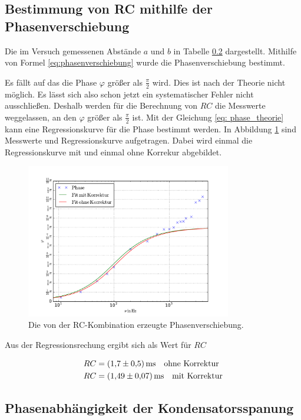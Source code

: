 \subsection{Bestimmung von RC mithilfe der Phasenverschiebung}
Die im Versuch gemessenen Abstände $a$ und $b$ in Tabelle \ref{}
dargestellt. Mithilfe von Formel \eqref{eq:phasenverschiebung} wurde die
Phasenverschiebung bestimmt.

Es fällt auf das die Phase $\varphi$ größer als $\frac{\pi}{2}$ wird.
Dies ist nach der Theorie nicht möglich.
Es lässt sich also schon jetzt ein systematischer Fehler nicht ausschließen.
Deshalb werden für die Berechnung von $RC$ die Messwerte weggelassen, an den
$\varphi$ größer als $\frac{\pi}{2}$ ist.
Mit der Gleichung \eqref{eq: phase_theorie} kann eine Regressionskurve für die
Phase bestimmt werden.
In Abbildung \ref{fig:plot_teil_c} sind Messwerte und Regressionskurve aufgetragen.
Dabei wird einmal die Regressionskurve mit und einmal ohne Korrekur abgebildet.
\begin{figure}
  \includegraphics[width=0.8\textwidth]{pics/frequenz_phase.pdf}
  \caption{Die von der RC-Kombination erzeugte Phasenverschiebung.}
  \label{fig:plot_teil_c}
\end{figure}
Aus der Regressionsrechung ergibt sich als Wert für $RC$

\begin{align}
  \label{eq:teil_c_rc}
  \begin{aligned}
    RC&=\SI{1.7\pm0.5}{\milli\second} \quad \text{ohne Korrektur} \\
    RC& =\SI{1.49\pm0.07}{\milli\second} \quad \text{mit Korrektur}
\end{aligned}
\end{align}

\subsection{Phasenabhängigkeit der Kondensatorsspanung}

